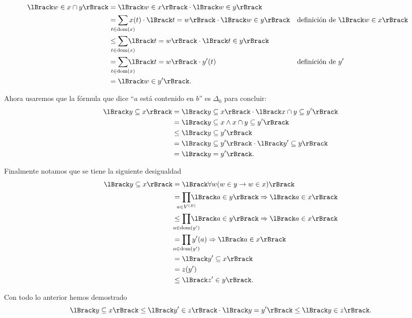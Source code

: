 \documentclass[letterpaper,DIV=15,12pt]{scrartcl}
\theoremstyle{manual}
\DeclarePairedDelimiter{\vb}{\lBrack}{\rBrack}             %
\DeclareMathOperator{\dom}{dom}                            %
\begin{document}
\begin{align*}
  \vb{w\in x\cap y} &= \vb{w\in x}\cdot\vb{w\in y}\\
  &= \smashoperator{\sum_{t\in\dom(x)}}x(t)\cdot\vb{t=w}\cdot\vb{w\in y}
  && \text{definición de \(\vb{w\in x}\)}\\
  &\leq \smashoperator{\sum_{t\in\dom(x)}}\vb{t=w}\cdot\vb{t\in y}\\
  &= \smashoperator{\sum_{t\in\dom(x)}}\vb{t=w}\cdot y'(t)
  && \text{definición de \(y'\)}\\
  &= \vb{w\in y'}.
\end{align*}

Ahora usaremos que la fórmula que dice 
\enquote{\(a\) está contenido en \(b\)} es \(\Delta_{0}\) para concluir:
\begin{align*}
  \vb{y\subseteq x} &= \vb{y\subseteq x}\cdot\vb{x\cap y\subseteq y'}\\
  &= \vb{y\subseteq x\land x\cap y\subseteq y'}\\
  &\leq \vb{y\subseteq y'}\\
  &= \vb{y\subseteq y'}\cdot\vb{y'\subseteq y}\\
  &= \vb{y=y'}.
\end{align*}

Finalmente notamos que se tiene la siguiente desigualdad
\begin{align*}
  \vb{y\subseteq x} &= \vb{\forall w(w\in y\to w\in x)}\\
  &= \smashoperator{\prod_{a\in\mb}}\vb{a\in y}\Rightarrow\vb{a\in x}\\
  &\leq \smashoperator{\prod_{a\in\dom(y')}}\vb{a\in y}\Rightarrow\vb{a\in x}\\
  &= \smashoperator{\prod_{a\in\dom(y')}}y'(a)\Rightarrow\vb{a\in x}\\
  &= \vb{y'\subseteq x}\\
  &= z(y')\\
  &\leq \vb{z'\in y}.
\end{align*}

Con todo lo anterior hemos demostrado
\begin{equation*}
  \vb{y\subseteq x}\leq\vb{y'\in z}\cdot\vb{y=y'}\leq\vb{y\in z}.
\end{equation*}
\end{document}
